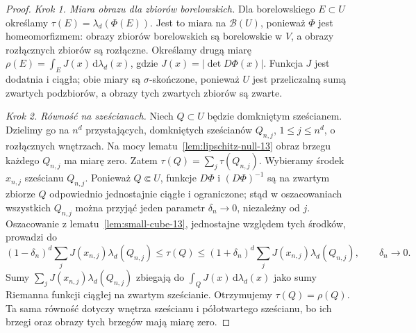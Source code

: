 \documentclass[11pt,a4paper,oneside]{book}
\numberwithin{equation}{chapter}
\theoremstyle{plain}
\theoremstyle{definition}
\theoremstyle{remark}
\begin{document}
\begin{proof}
\emph{Krok 1. Miara obrazu dla zbiorów borelowskich.}
Dla borelowskiego $E\subset U$ określamy
$\tau(E)=\lambda_d(\Phi(E))$. Jest to miara na
$\mathcal B(U)$, ponieważ $\Phi$ jest homeomorfizmem:
obrazy zbiorów borelowskich są borelowskie w $V$, a obrazy
rozłącznych zbiorów są rozłączne. Określamy drugą miarę
$\rho(E)=\int_E J(x)\,\mathrm d\lambda_d(x)$,
gdzie $J(x)=|\det D\Phi(x)|$. Funkcja $J$ jest dodatnia
i ciągła; obie miary są $\sigma$-skończone, ponieważ
$U$ jest przeliczalną sumą zwartych podzbiorów,
a obrazy tych zwartych zbiorów są zwarte.

\emph{Krok 2. Równość na sześcianach.}
Niech $Q\subset U$ będzie domkniętym sześcianem.
Dzielimy go na $n^d$ przystających, domkniętych
sześcianów $Q_{n,j}$, $1\le j\le n^d$, o rozłącznych wnętrzach.
Na mocy lematu~\ref{lem:lipschitz-null-13} obraz brzegu
każdego $Q_{n,j}$ ma miarę zero. Zatem
$\tau(Q)=\sum_j\tau(Q_{n,j})$.
Wybieramy środek $x_{n,j}$ sześcianu $Q_{n,j}$.
Ponieważ $Q\Subset U$, funkcje $D\Phi$ i
$(D\Phi)^{-1}$ są na zwartym zbiorze $Q$ odpowiednio
jednostajnie ciągłe i ograniczone; stąd w oszacowaniach
wszystkich $Q_{n,j}$ można przyjąć jeden parametr
$\delta_n\to0$, niezależny od $j$.
Oszacowanie z lematu~\ref{lem:small-cube-13},
jednostajne względem tych środków, prowadzi do
\[
(1-\delta_n)^d\sum_jJ(x_{n,j})\lambda_d(Q_{n,j})
\le\tau(Q)\le
(1+\delta_n)^d\sum_jJ(x_{n,j})\lambda_d(Q_{n,j}),
\qquad\delta_n\to0.
\]
Sumy $\sum_jJ(x_{n,j})\lambda_d(Q_{n,j})$ zbiegają
do $\int_QJ(x)\,\mathrm d\lambda_d(x)$ jako sumy Riemanna
funkcji ciągłej na zwartym sześcianie. Otrzymujemy
$\tau(Q)=\rho(Q)$. Ta sama równość dotyczy wnętrza
sześcianu i półotwartego sześcianu, bo ich brzegi
oraz obrazy tych brzegów mają miarę zero.


\end{proof}
\end{document}
